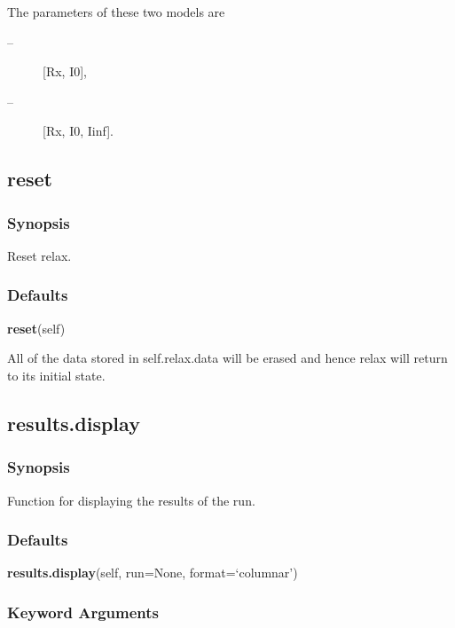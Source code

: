  The parameters of these two models are 
  

 \begin{description} 
 \item[ --] [Rx, I0],  
 \item[ --] [Rx, I0, Iinf].  
 \end{description} 
  

  

 \newpage 

 \subsection{reset} 

  
 \subsubsection{Synopsis} 

 Reset relax. 
  

  
 \subsubsection{Defaults} 

 \textsf{\textbf{reset}(self)} 

 All of the data stored in self.relax.data will be erased and hence relax will return to its initial state. 
  

  

 \newpage 

 \subsection{results.display} 

  
 \subsubsection{Synopsis} 

 Function for displaying the results of the run. 
  

  
 \subsubsection{Defaults} 

 \textsf{\textbf{results.display}(self, run=None, format=`columnar')} 

  
 \subsubsection{Keyword Arguments} 

